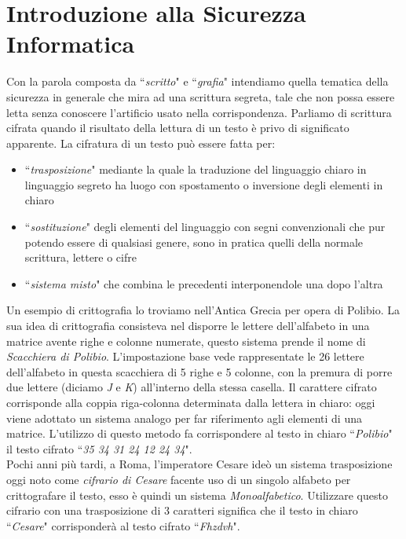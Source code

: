 \documentclass[a4paper,12pt]{tesiinfo}
\begin{document}
\contentspage %



\chapter{Introduzione alla Sicurezza Informatica}
Con la parola composta da ``\textit{scritto}" e ``\textit{grafia}" intendiamo quella tematica della sicurezza in generale che mira ad una scrittura segreta, tale che non possa essere letta senza conoscere l'artificio usato nella corrispondenza. Parliamo di scrittura cifrata quando il risultato della lettura di un testo \`e privo di significato apparente. La cifratura di un testo pu\`o essere fatta per:
\begin{itemize}
 \item ``\textit{trasposizione}" mediante la quale la traduzione del linguaggio chiaro in linguaggio segreto ha luogo con spostamento o inversione degli elementi in chiaro
 \item ``\textit{sostituzione}" degli elementi del linguaggio con segni convenzionali che pur potendo essere di qualsiasi genere, sono in pratica quelli della normale scrittura, lettere o cifre
 \item ``\textit{sistema misto}" che combina le precedenti interponendole una dopo l'altra
\end{itemize} 
Un esempio di crittografia lo troviamo nell'Antica Grecia per opera di Polibio. La sua idea di crittografia consisteva nel disporre le lettere dell'alfabeto in una matrice avente righe e colonne numerate, questo sistema prende il nome di \textit{Scacchiera di Polibio}. L'impostazione base vede rappresentate le 26 lettere dell'alfabeto in questa scacchiera di 5 righe e 5 colonne, con la premura di porre due lettere (diciamo \textit{J} e \textit{K}) all'interno della stessa casella. Il carattere cifrato corrisponde alla coppia riga-colonna determinata dalla lettera in chiaro: oggi viene adottato un sistema analogo per far riferimento agli elementi di una matrice. L'utilizzo di questo metodo fa corrispondere al testo in chiaro ``\textit{Polibio}" il testo cifrato ``\emph{35 34 31 24 12 24 34}". 
\\
Pochi anni pi\`u tardi, a Roma, l'imperatore Cesare ide\`o un sistema trasposizione oggi noto come \textit{cifrario di Cesare} facente uso di un singolo alfabeto per crittografare il testo, esso \`e quindi un sistema \textit{Monoalfabetico}. Utilizzare questo cifrario con una trasposizione di 3 caratteri significa che il testo in chiaro ``\textit{Cesare}" corrisponder\`a al testo cifrato ``\textit{Fhzdvh}".
\end{document}
